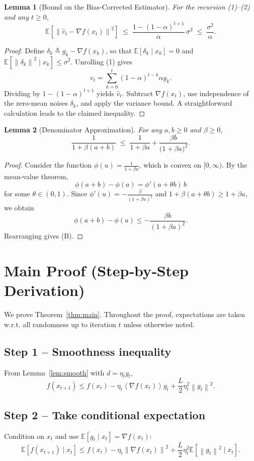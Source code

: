 \documentclass{article}
\newtheorem{lemma}{Lemma}
\newcommand{\EE}{\mathbb{E}}
\newcommand{\norm}[1]{\left\|#1\right\|}
\newcommand{\inner}[1]{\left\langle #1 \right\rangle}
\begin{document}
\begin{lemma}[Bound on the Bias‑Corrected Estimator]\label{lem:vtbound}
For the recursion (1)–(2) and any $t\ge0$,
\[
\EE\!\left[\norm{\hat v_t-\nabla f(x_t)}^2\right]
\;\le\;
\frac{1-(1-\alpha)^{t+1}}{\alpha}\,\sigma^2
\;\le\;
\frac{\sigma^2}{\alpha}.
\]
\end{lemma}
\begin{proof}
Define $\delta_k\triangleq g_k-\nabla f(x_k)$, so that $\EE[\delta_k\mid x_k]=0$ and
$\EE[\norm{\delta_k}^2\mid x_k]\le\sigma^2$.
Unrolling (1) gives
\[
v_t=\sum_{k=0}^{t}(1-\alpha)^{t-k}\alpha g_k .
\]
Dividing by $1-(1-\alpha)^{t+1}$ yields $\hat v_t$.
Subtract $\nabla f(x_t)$, use independence of the zero‑mean noises $\delta_k$, and apply the variance bound.
A straightforward calculation leads to the claimed inequality. \qedhere
\end{proof}

\begin{lemma}[Denominator Approximation]\label{lem:denom}
For any $a,b\ge0$ and $\beta\ge0$,
\[
\frac{1}{1+\beta(a+b)}\;\le\;
\frac{1}{1+\beta a}+\frac{\beta b}{\bigl(1+\beta a\bigr)^{2}} .
\tag{B}
\]
\end{lemma}
\begin{proof}
Consider the function $\phi(u)=\frac{1}{1+\beta u}$, which is convex on $[0,\infty)$.
By the mean‑value theorem,
\[
\phi(a+b)-\phi(a)=\phi'(a+\theta b)\,b
\]
for some $\theta\in(0,1)$. Since $\phi'(u)=-\frac{\beta}{(1+\beta u)^{2}}$ and
$1+\beta(a+\theta b)\ge 1+\beta a$, we obtain
\[
\phi(a+b)-\phi(a)\le -\frac{\beta b}{(1+\beta a)^{2}} .
\]
Rearranging gives (B). \qedhere
\end{proof}

\section*{Main Proof (Step‑by‑Step Derivation)}
We prove Theorem~\ref{thm:main}. Throughout the proof, expectations are taken w.r.t. all randomness up to iteration $t$ unless otherwise noted.

\subsection*{Step 1 – Smoothness inequality}
From Lemma~\ref{lem:smooth} with $d=\eta_t g_t$,
\[
f(x_{t+1})\le f(x_t)-\eta_t\inner{\nabla f(x_t)}{g_t}
+\frac{L}{2}\eta_t^{2}\norm{g_t}^{2}. \tag{5}
\]

\subsection*{Step 2 – Take conditional expectation}
Condition on $x_t$ and use $\EE[g_t\mid x_t]=\nabla f(x_t)$:
\[
\EE\!\left[f(x_{t+1})\mid x_t\right]\le
f(x_t)-\eta_t\norm{\nabla f(x_t)}^{2}
+\frac{L}{2}\eta_t^{2}\EE\!\left[\norm{g_t}^{2}\mid x_t\right].
\tag{6}
\]
\end{document}
